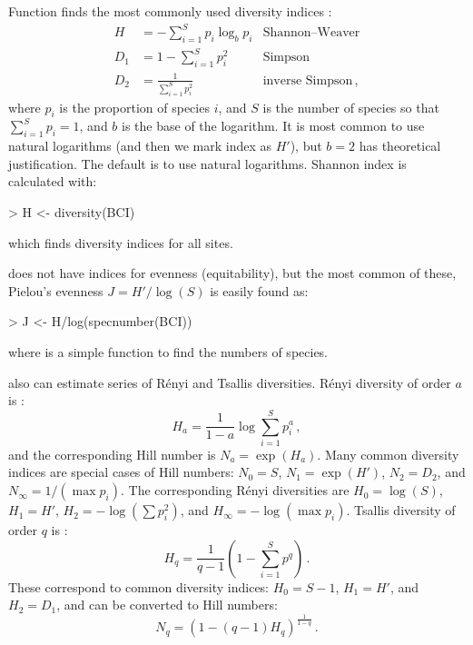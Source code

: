 \documentclass[a4paper,10pt,twocolumn]{article}
\begin{document}
Function  finds the most commonly used diversity
indices \citep{Hill73number}:
\begin{align}
H &= - \sum_{i=1}^S p_i \log_b  p_i & \text{Shannon--Weaver}\\
D_1 &= 1 - \sum_{i=1}^S p_i^2  &\text{Simpson}\\
D_2 &= \frac{1}{\sum_{i=1}^S p_i^2}  &\text{inverse Simpson}\,,
\end{align}
where $p_i$ is the proportion of species $i$, and $S$ is the number of
species so that $\sum_{i=1}^S p_i = 1$, and $b$ is the base of the
logarithm.  It is most common to use natural logarithms (and then we
mark index as $H'$), but $b=2$ has
theoretical justification. The default is to use natural logarithms.
Shannon index is calculated with:
\begin{Schunk}
\begin{Sinput}
> H <- diversity(BCI)
\end{Sinput}
\end{Schunk}
which finds diversity indices for all sites.

 does not have indices for evenness (equitability), but
the most common of these, Pielou's evenness $J = H'/\log(S)$ is easily
found as:
\begin{Schunk}
\begin{Sinput}
> J <- H/log(specnumber(BCI))
\end{Sinput}
\end{Schunk}
where  is a simple  function to find
the numbers of species.

 also can estimate series of R\'{e}nyi and Tsallis
diversities. R{\'e}nyi diversity of order $a$ is \citep{Hill73number}:
\begin{equation}
H_a = \frac{1}{1-a} \log \sum_{i=1}^S p_i^a \,,
\end{equation}
and the corresponding Hill number is $N_a = \exp(H_a)$.  Many common
diversity indices are special cases of Hill numbers: $N_0 = S$, $N_1 =
\exp(H')$, $N_2 = D_2$, and $N_\infty = 1/(\max p_i)$. The
corresponding R\'{e}nyi diversities are $H_0 = \log(S)$, $H_1 = H'$, $H_2 =
- \log(\sum p_i^2)$, and $H_\infty = - \log(\max p_i)$.  
Tsallis diversity of order $q$ is \citep{Tothmeresz95}:
\begin{equation}
  H_q = \frac{1}{q-1} \left(1 - \sum_{i=1}^S p^q \right) \, .
\end{equation}
These correspond to common diversity indices: $H_0 = S-1$, $H_1 = H'$,
and $H_2 = D_1$, and can be converted to Hill numbers:
\begin{equation}
  N_q = (1 - (q-1) H_q )^\frac{1}{1-q} \, .
\end{equation}
\end{document}
